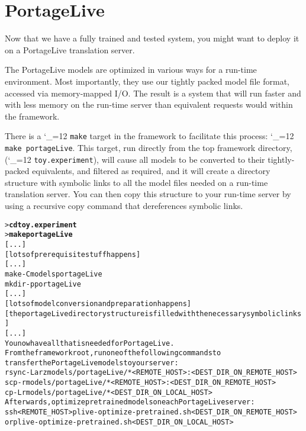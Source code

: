 \documentclass[11pt,letterpaper]{article}
\def\code{\begingroup\catcode`\_=12 \codex}
\newcommand{\codex}[1]{\texttt{#1}\endgroup}
\begin{document}
\section{PortageLive} \label{PLive}

Now that we have a fully trained and tested system, you might want to deploy it
on a PortageLive translation server.

The PortageLive models are optimized in various ways for a run-time
environment.  Most importantly, they use our tightly packed model file format,
accessed via memory-mapped I/O.
The result is a system that will run faster and with less memory on the
run-time server than equivalent requests would within the framework.

There is a \code{make} target in the framework to facilitate this process:
\code{make portageLive}.  This target, run directly from the top framework
directory, (\code{toy.experiment}), will cause all models to be converted to
their tightly-packed equivalents, and
filtered as required, and it will create a directory structure with symbolic
links to all the model files needed on a run-time translation server.  You can
then copy this structure to your run-time server by using a recursive copy
command that dereferences symbolic links.

\begin{small}
\begin{alltt}
   > \textbf{cd toy.experiment}
   > \textbf{make portageLive}
   [...]
   [lots of prerequisite stuff happens]
   [...]
   make -C models portageLive
   mkdir -p portageLive
   [...]
   [lots of model conversion and preparation happens]
   [the portageLive directory structure is filled with the necessary symbolic links]
   [...]
   You now have all that is needed for PortageLive.
   From the framework root, run one of the following commands to
   transfer the PortageLive models to your server:
   rsync -Larz models/portageLive/* <REMOTE_HOST>:<DEST_DIR_ON_REMOTE_HOST>
   scp -r models/portageLive/* <REMOTE_HOST>:<DEST_DIR_ON_REMOTE_HOST>
   cp -Lr models/portageLive/* <DEST_DIR_ON_LOCAL_HOST>
   Afterwards, optimize pretrained models on each PortageLive server:
        ssh <REMOTE_HOST> plive-optimize-pretrained.sh <DEST_DIR_ON_REMOTE_HOST>
   or   plive-optimize-pretrained.sh <DEST_DIR_ON_LOCAL_HOST>
\end{alltt}
\end{small}
\end{document}
